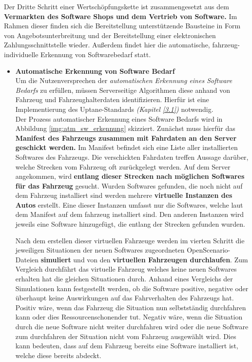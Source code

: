 Der Dritte Schritt einer Wertschöpfungskette ist zusammengesetzt aus dem\textbf{ Vermarkten des Software Shops und dem Vertrieb von Software. } Im Rahmen dieser finden sich die Bereitstellung unterstützende Bausteine in Form von Angebotsunterbreitung und der Bereitstellung einer elektronischen Zahlungsschnittstelle wieder. Außerdem findet hier die automatische, fahrzeug-individuelle Erkennung von Softwarebedarf statt.
\begin{itemize}
	\item[] \hspace{-0.6cm} \textbf{Automatische Erkennung von Software Bedarf}\\
	Um die Nutzenversprechen der \textit{automatischen Erkennung eines Software Bedarfs }zu erfüllen, müssen Serverseitige Algorithmen diese anhand von Fahrzeug und Fahrzeughalterdaten identifizieren. Hierfür ist eine Implementierung des Uptane-Standards \textit{(Kapitel \ref{3.1})} notwendig. \\
	
	Der Prozess automatischer Erkennung eines Software Bedarfs wird in Abbildung \ref{img:atm_sw_erkennung} skizziert. Zunächst muss hierfür das\textbf{ Manifest des Fahrzeugs zusammen mit Fahrdaten an den Server geschickt werden.} Im Manifest befindet sich eine Liste aller installierten Softwares des Fahrzeugs. Die verschickten Fahrdaten treffen Aussage darüber, welche Strecken vom Fahrzeug oft zurückgelegt werden. Auf dem Server angekommen, wird \textbf{entlang dieser Strecken nach möglichen Softwares für das Fahrzeug} gesucht. Wurden Softwares gefunden, die noch nicht auf dem Fahrzeug installiert sind werden mehrere \textbf{virtuelle Instanzen des Autos} erstellt. Eine dieser Instanzen umfasst nur die Softwares, welche laut dem Manifest auf dem fahrzeug installiert sind. Den anderen Instanzen wird jeweils eine Software hinzugefügt, die entlang der Strecken gefunden wurden.
	
	Nach dem erstellen dieser virtuellen Fahrzeuge werden im vierten Schritt die jeweiligen Situationen der neuen Softwares zugeordneten OpenScenario-Dateien \textbf{simuliert} und von den \textbf{virtuellen Fahrzeugen durchlaufen}. Zum Vergleich durchfährt das virtuelle Fahrzeug welches keine neuen Softwares erhalten hat die gleichen Situationen durch. Anhand eines Vergleichs der Simulationen kann festgestellt werden, ob die Software positive, negative oder überhaupt keine Auswirkungen auf das Fahrverhalten des Fahrzeugs hat. Positiv wäre, wenn das Fahrzeug die Situation nun selbstständig durchfahren kann oder dies Ressourcenschonender tut. Negativ wäre, wenn die Situation durch die neue Software nicht weiter durchfahren wird oder die neue Software zum durchfahren der Situation nicht vom Fahrzeug ausgewählt wird. Dies kann bedeuten, dass auf dem Fahrzeug bereits eine Software installiert ist, welche diese bereits abdeckt.\\
	

\end{itemize}

